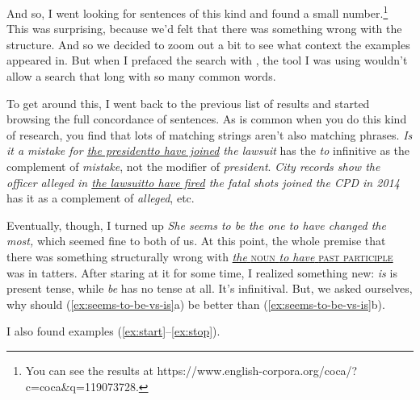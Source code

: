 And so, I went looking for sentences of this kind and found a small number.\footnote{You can see the results at https://www.english-corpora.org/coca/?c=coca\&q=119073728.} This was surprising, because we'd felt that there was something wrong with the structure. And so we decided to zoom out a bit to see what context the examples appeared in. But when I prefaced the search with , the tool I was using wouldn't allow a search that long with so many common words.

To get around this, I went back to the previous list of results and started browsing the full concordance of sentences. As is common when you do this kind of research, you find that lots of matching strings aren't also matching phrases. \textit{Is it a mistake \ob for \uline{the president\cb to have joined} the lawsuit} has the \textit{to} infinitive as the complement of \textit{mistake}, not the modifier of \textit{president}. \textit{City records show the officer alleged \ob in \uline{the lawsuit\cb to have fired} the fatal shots joined the CPD in 2014} has it as a complement of \textit{alleged}, etc.

Eventually, though, I turned up \textit{She seems to be the one to have changed the most,} which seemed fine to both of us. At this point, the whole premise that there was something structurally wrong with \uline{\textit{the} \textsc{noun} \textit{to have} \textsc{past participle}} was in tatters. After staring at it for some time, I realized something new: \textit{is} is present tense, while \textit{be} has no tense at all. It's infinitival. But, we asked ourselves, why should (\ref{ex:seems-to-be-vs-is}a) be better than (\ref{ex:seems-to-be-vs-is}b).

\ea \label{ex:seems-to-be-vs-is}
    \z
\z

\noindent I also found examples (\ref{ex:start}--\ref{ex:stop}).

\label{ex:start}\z
{}\z
{}\z
{}\z
{}\z
{}\label{ex:stop}\z

